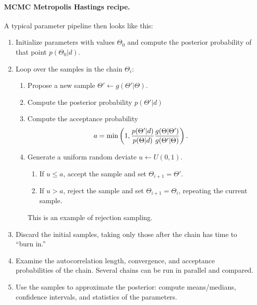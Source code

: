 \paragraph{MCMC Metropolis Hastings recipe.}   A typical parameter pipeline then looks like this:
\begin{enumerate}
\item Initialize parameters with values $\Theta_0$ and compute the posterior probability of that point $p(\Theta_0|d)$.
  
\item Loop over the samples in the chain $\Theta_i$:
  \begin{enumerate}
  \item Propose a new sample $\Theta' \leftarrow g(\Theta'|\Theta)$. %
    \item Compute the posterior probability $p(\Theta'|d)$
  \item Compute the acceptance probability $$ a = {\rm  min} \left( 1,   \frac{p(\Theta'|d) }{p(\Theta|d)} \frac{g(\Theta|\Theta')}{g(\Theta'|\Theta)}  \right).$$
  \item Generate a uniform random deviate $u \leftarrow U(0,1)$.
    \begin{enumerate}
    \item If $u \leq a$, accept the sample and set $\Theta_{i+1} = \Theta'$.
    \item If $u > a$, reject the sample and set $\Theta_{i+1} = \Theta_i$, repeating the current sample.
    \end{enumerate}
    This is an example of rejection sampling.
  \end{enumerate}
\item Discard the initial samples, taking only those after the chain has time to ``burn in.''
\item Examine the autocorrelation length, convergence, and acceptance probabilities of the chain.  Several chains can be run in parallel and compared.
\item Use the samples to approximate the posterior: compute means/medians, confidence intervals, and statistics of the parameters.
\end{enumerate}

